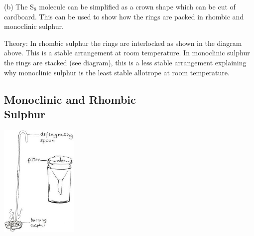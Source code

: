 \begin{multicols}{2}
\begin{description*}
{(b) The S$_8$ molecule can be simplified as a
crown shape which can be cut of cardboard.
This can be used to show how the rings are
packed in rhombic and monoclinic sulphur.}
\item[Theory:]{In rhombic sulphur the rings are interlocked
as shown in the diagram above. This is a stable
arrangement at room temperature. In
monoclinic sulphur the rings are stacked (see
diagram), this is a less stable arrangement
explaining why monoclinic sulphur is the least
stable allotrope at room temperature.}
\end{description*}

\subsection[Monoclinic and Rhombic Sulphur]{Monoclinic and Rhombic \hfill \\ Sulphur}

\begin{center}
\includegraphics[width=0.28\textwidth]{./img/source/sulphur-monoclinic.jpg}
\end{center}


\end{multicols}
